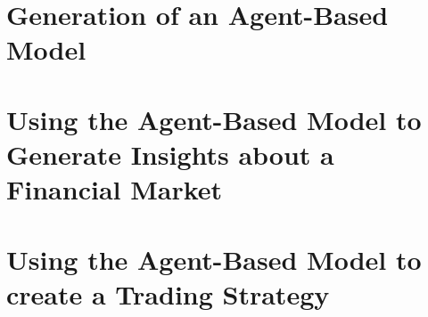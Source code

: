 \section{Generation of an Agent-Based Model}
\label{section:generation-of-an-agent-based-model}

\section{Using the Agent-Based Model to Generate Insights about a Financial
Market}
\label{section:using-the-agent-based-model-to-generate-insights-about-a-financial-market}

\section{Using the Agent-Based Model to create a Trading Strategy}
\label{section:using-the-agent-based-model-to-create-a-trading-strategy}
